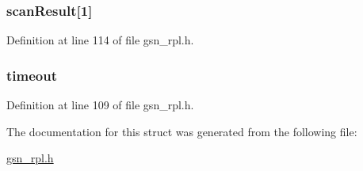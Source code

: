 \hypertarget{a00209_a7663fdcd4e756dbfbf23bb2c3aba911b}{
\subsubsection[{scanResult}]{ {\bf scanResult}\mbox{[}1\mbox{]}}}
\label{a00209_a7663fdcd4e756dbfbf23bb2c3aba911b}


Definition at line 114 of file gsn\_\-rpl.h.

\hypertarget{a00209_a89d0e080863509070eee6b8c7a2333c1}{
\subsubsection[{timeout}]{ {\bf timeout}}}
\label{a00209_a89d0e080863509070eee6b8c7a2333c1}


Definition at line 109 of file gsn\_\-rpl.h.



The documentation for this struct was generated from the following file:\begin{DoxyCompactItemize}
\item 
\hyperlink{a00579}{gsn\_\-rpl.h}\end{DoxyCompactItemize}
